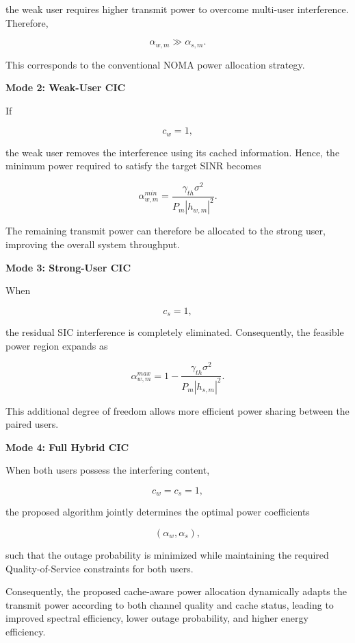 \documentclass[conference]{IEEEtran}
\begin{document}
the weak user requires higher transmit power to overcome multi-user interference. Therefore,

\begin{equation}
\alpha_{w,m}\gg\alpha_{s,m}.
\end{equation}

This corresponds to the conventional NOMA power allocation strategy.

\textbf{Mode 2: Weak-User CIC}

If

\[
c_w=1,
\]

the weak user removes the interference using its cached information. Hence, the minimum power required to satisfy the target SINR becomes

\begin{equation}
\alpha_{w,m}^{min}
=
\frac{\gamma_{th}\sigma^2}
{P_m|h_{w,m}|^2}.
\label{eq:weakpower}
\end{equation}

The remaining transmit power can therefore be allocated to the strong user, improving the overall system throughput.

\textbf{Mode 3: Strong-User CIC}

When

\[
c_s=1,
\]

the residual SIC interference is completely eliminated. Consequently, the feasible power region expands as

\begin{equation}
\alpha_{w,m}^{max}
=
1-
\frac{\gamma_{th}\sigma^2}
{P_m|h_{s,m}|^2}.
\label{eq:strongpower}
\end{equation}

This additional degree of freedom allows more efficient power sharing between the paired users.

\textbf{Mode 4: Full Hybrid CIC}

When both users possess the interfering content,

\[
c_w=c_s=1,
\]

the proposed algorithm jointly determines the optimal power coefficients

\[
(\alpha_w,\alpha_s),
\]

such that the outage probability is minimized while maintaining the required Quality-of-Service constraints for both users.

Consequently, the proposed cache-aware power allocation dynamically adapts the transmit power according to both channel quality and cache status, leading to improved spectral efficiency, lower outage probability, and higher energy efficiency.
\end{document}
